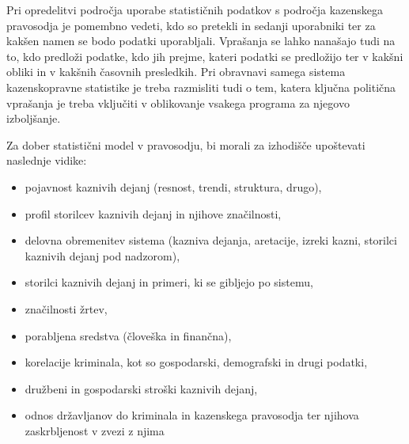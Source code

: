 \documentclass[12pt,a4paper]{amsart}
\theoremstyle{definition} %
\theoremstyle{plain} %
\begin{document}
\title{}
\author{Neža Kržan}
\maketitle
Pri opredelitvi področja uporabe statističnih podatkov s področja kazenskega pravosodja je pomembno vedeti, kdo so pretekli in sedanji uporabniki 
ter za kakšen namen se bodo podatki uporabljali. Vprašanja se lahko nanašajo tudi na to, kdo predloži podatke, kdo jih prejme, kateri podatki se 
predložijo ter v kakšni obliki in v kakšnih časovnih presledkih. Pri obravnavi samega sistema kazenskopravne statistike je treba razmisliti tudi o 
tem, katera ključna politična vprašanja je treba vključiti v oblikovanje vsakega programa za njegovo izboljšanje.

Za dober statistični model v pravosodju, bi morali za izhodišče upoštevati naslednje vidike:
\begin{itemize}
    \item pojavnost kaznivih dejanj (resnost, trendi, struktura, drugo),
    \item profil storilcev kaznivih dejanj in njihove značilnosti,
    \item delovna obremenitev sistema (kazniva dejanja, aretacije, izreki kazni, storilci kaznivih dejanj pod nadzorom),
    \item storilci kaznivih dejanj in primeri, ki se gibljejo po sistemu,
    \item značilnosti žrtev,
    \item porabljena sredstva (človeška in finančna),
    \item korelacije kriminala, kot so gospodarski, demografski in drugi podatki,
    \item družbeni in gospodarski stroški kaznivih dejanj,
    \item odnos državljanov do kriminala in kazenskega pravosodja ter njihova zaskrbljenost v zvezi z njima
\end{itemize}
\end{document}
